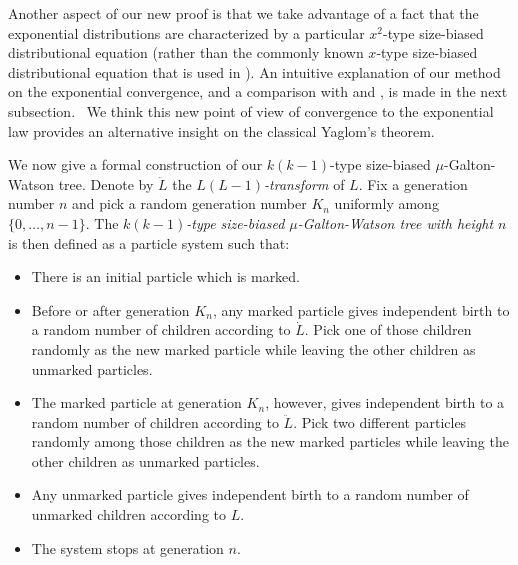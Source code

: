 \documentclass[12pt,a4paper]{amsart}
\numberwithin{equation}{section}
\begin{document}
	Another aspect of our new proof is that we take advantage of a fact that the exponential distributions are characterized by a particular $x^2$-type size-biased distributional equation (rather than the commonly known $x$-type size-biased distributional equation that is used in \cite{lyons1995conceptual}).
	An intuitive explanation of our method on the exponential convergence, and a comparison with \cite{geiger2000new} and \cite{lyons1995conceptual}, is made in the next subsection.  
	We think this new point of view of convergence to the exponential law provides an alternative insight on the classical Yaglom's theorem.

	We now give a formal construction of our $k(k-1)$-type size-biased $\mu$-Galton-Watson tree.
	Denote by $\ddot L$ the \emph{$L(L-1)$-transform} of $L$.
	Fix a generation number $n$ and pick a random generation number $K_n$ uniformly among $\{0,\dots,n-1\}$.
	The \emph{$k(k-1)$-type size-biased $\mu$-Galton-Watson tree with height $n$} is then defined as a particle system such that:
\begin{itemize}
\item
	There is an initial particle which is marked.
\item
	Before or after generation $K_n$, any marked particle gives independent birth to a random number of children according to $\dot L$.
	Pick one of those children randomly as the new marked particle while leaving the other children as unmarked particles.
\item
	The marked particle at generation $K_n$, however, gives independent birth to a random number of children according to $\ddot L$.
	Pick two different particles randomly among those children as the new marked particles while leaving the other children as unmarked particles.
\item
	Any unmarked particle gives independent birth to a random number of unmarked children according to $L$.
\item
	The system stops at generation $n$.
\end{itemize}
\end{document}
